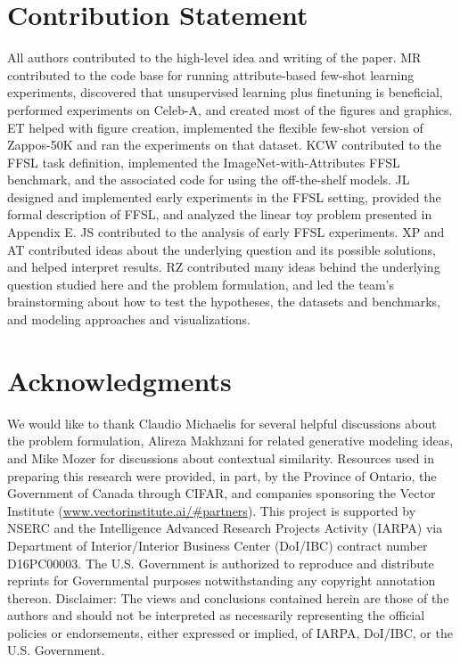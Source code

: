 \ifarxiv
\section*{Contribution Statement}
All authors contributed to the high-level idea and writing of the paper. MR contributed to the code base for running attribute-based few-shot learning experiments, discovered that unsupervised learning plus finetuning is beneficial, performed experiments on Celeb-A, and created most of the figures and graphics. ET helped with figure creation, implemented the flexible few-shot version of Zappos-50K and ran the experiments on that dataset. KCW contributed to the FFSL task definition, implemented the ImageNet-with-Attributes FFSL benchmark, and the associated code for using the off-the-shelf models. JL designed and implemented early experiments in the FFSL setting, provided the formal description of FFSL, and analyzed the linear toy problem presented in Appendix E. JS contributed to the analysis of early FFSL experiments. XP and AT contributed ideas about the underlying question and its possible solutions, and helped interpret results. RZ contributed many ideas behind the underlying question studied here and the
problem formulation, and led the team's brainstorming about how to test the hypotheses, the datasets and benchmarks, and modeling approaches and visualizations.

\section*{Acknowledgments}
We would like to thank Claudio Michaelis for several helpful discussions about the problem formulation, Alireza Makhzani for related generative modeling ideas, and Mike Mozer for discussions about contextual similarity. Resources used in preparing this research were provided, in part, by the Province of Ontario, the
Government of Canada through CIFAR, and companies sponsoring the Vector Institute
(\url{www.vectorinstitute.ai/\#partners}). This project is supported by NSERC and the Intelligence
Advanced Research Projects Activity (IARPA) via Department of Interior/Interior Business Center
(DoI/IBC) contract number D16PC00003. The U.S. Government is authorized to reproduce and distribute
reprints for Governmental purposes notwithstanding any copyright annotation thereon. Disclaimer: The
views and conclusions contained herein are those of the authors and should not be interpreted as
necessarily representing the official policies or endorsements, either expressed or implied, of
IARPA, DoI/IBC, or the U.S. Government.
\fi